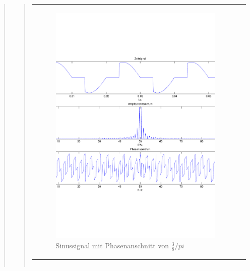 \begin{quote}
\begin{quote}
\begin{center}
\begin{tabular}{ll}
\begin{minipage}{0.6\textwidth}
                     \begin{figure}[H]
                        \label{fig:}
                        \includegraphics[scale=0.3]{./Bilder/Phasenanschnitt38pi.pdf} %
                        \caption{Sinussignal mit Phasenanschnitt von $\frac{3}{8}/pi$}
                    \end{figure}
               \vspace{-1.5em}

                \end{minipage}

            \end{tabular}
            \end{center}

            \begin{center}
            \begin{tabular}{ll}


\end{tabular}
\end{center}
\end{quote}
\end{quote}
